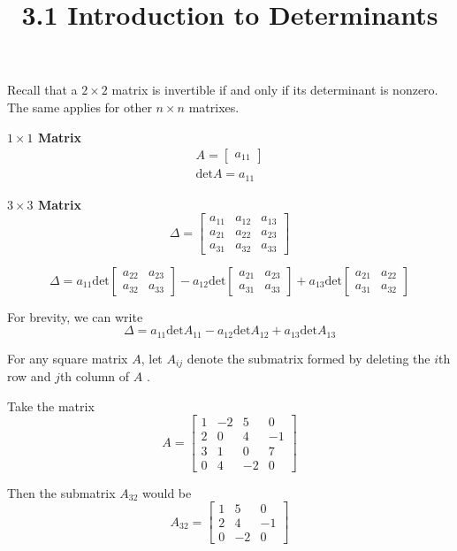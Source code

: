 \documentclass{article}
\title{3.1 Introduction to Determinants}
\begin{document}
  \maketitle
  Recall that a $ 2 \times 2 $ matrix is invertible if and only if its determinant is nonzero. The same applies for other $ n 
  \times n $  matrixes.

  \textbf{$ 1 \times 1 $ Matrix}
  \[
    \begin{gathered}
    A = \begin{bmatrix}
      a_{11}
    \end{bmatrix}\\
    \text{det}A = a_{11}
    \end{gathered}
  \]
  
  \textbf{$ 3 \times 3 $ Matrix}
  \[
   \Delta = \begin{bmatrix}
    a_{11} &a_{12} &a_{13}\\
    a_{21} &a_{22} &a_{23}\\
    a_{31} &a_{32} &a_{33}
  \end{bmatrix}
  \]
  
  \[
    \Delta = a_{11} \text{det}\begin{bmatrix}
      a_{22} &a_{23}\\
      a_{32} &a_{33}
    \end{bmatrix} - a_{12} \text{det}\begin{bmatrix}
      a_{21} &a_{23}\\
      a_{31} &a_{33} 
    \end{bmatrix}
      + a_{13} \text{det}\begin{bmatrix}
        a_{21} &a_{22}\\
        a_{31} &a_{32}
    \end{bmatrix}
  \]
 
  For brevity, we can write
  \[
    \Delta = a_{11} \text{det}A_{11}-a_{12}\text{det}A_{12}+a_{13}\text{det}A_{13}
  \]

  For any square matrix $ A $, let $ A_{ij} $ denote the submatrix formed by deleting the $ i $th row and $ j $th column of $ A $ .

  Take the matrix
  \[
    A = \begin{bmatrix}
      1 &-2 &5 &0\\
      2 &0 &4 &-1\\
      3 &1 &0 &7\\
      0 &4 &-2 &0
    \end{bmatrix}
  \]
  
  Then the submatrix $ A_{32} $ would be
  \[
    A_{32} = \begin{bmatrix}
      1 &5 &0\\
      2 &4 &-1\\
      0 &-2 &0
    \end{bmatrix}
  \]
\end{document}

